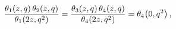 \[\frac{\mathop{\theta_{1}\/}\nolimits\!\left(z,q\right)\mathop{\theta_{2}\/}%
\nolimits\!\left(z,q\right)}{\mathop{\theta_{1}\/}\nolimits\!\left(2z,q^{2}%
\right)}=\frac{\mathop{\theta_{3}\/}\nolimits\!\left(z,q\right)\mathop{\theta_%
{4}\/}\nolimits\!\left(z,q\right)}{\mathop{\theta_{4}\/}\nolimits\!\left(2z,q^%
{2}\right)}=\mathop{\theta_{4}\/}\nolimits\!\left(0,q^{2}\right),\]